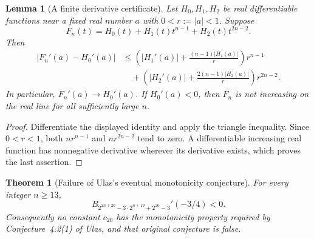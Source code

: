 \documentclass[11pt,a4paper]{article}
\newtheorem{theorem}{Theorem}
\newtheorem{lemma}{Lemma}[section]
\theoremstyle{definition}\newtheorem{definition}[lemma]{Definition}
\theoremstyle{remark}\newtheorem{remark}[lemma]{Remark}
\begin{document}
\begin{lemma}[A finite derivative certificate]\label{lem:derivative-certificate}
Let $H_0,H_1,H_2$ be real differentiable functions near a fixed real number
$a$ with $0<r:=|a|<1$. Suppose
\[
 F_n(t)=H_0(t)+H_1(t)t^{n-1}+H_2(t)t^{2n-2}.
\]
Then
\begin{align*}
 |F_n'(a)-H_0'(a)|
 &\leq\left(|H_1'(a)|+\frac{(n-1)|H_1(a)|}{r}\right)r^{n-1}\\
 &\quad+\left(|H_2'(a)|+\frac{2(n-1)|H_2(a)|}{r}\right)r^{2n-2}.
\end{align*}
In particular, $F_n'(a)\longrightarrow H_0'(a)$. If $H_0'(a)<0$,
then $F_n$ is not increasing on the real line for all sufficiently large
$n$.
\end{lemma}
\begin{proof}
Differentiate the displayed identity and apply the triangle inequality.
Since $0<r<1$, both $nr^{n-1}$ and $nr^{2n-2}$ tend to zero. A differentiable
increasing real function has nonnegative derivative wherever its derivative
exists, which proves the last assertion.
\end{proof}

\begin{theorem}[Failure of Ulas's eventual monotonicity conjecture]
\label{thm:ulas-counterexample}
For every integer $n\geq13$,
\[
 B_{2^{2n+20}-3\cdot2^{n+19}+2^{20}-3}'(-3/4)<0.
\]
Consequently no constant $c_{20}$ has the monotonicity property required by
Conjecture~4.2(1) of Ulas, and that original conjecture is false.
\end{theorem}
\end{document}
